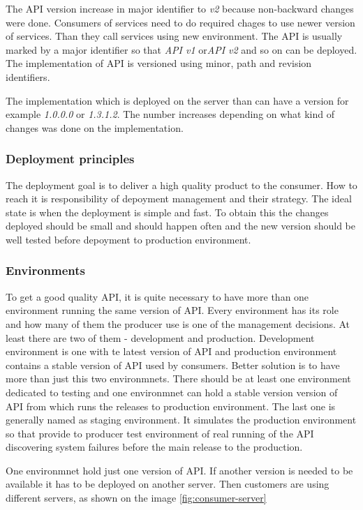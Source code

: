 The API version increase in major identifier to \emph{v2} because non-backward changes were done. Consumers of services need to do required chages to use newer version of services. Than they call services using new environment. 
The API is usually marked by a major identifier so that \emph{API v1} or\emph{API v2} and so on can be deployed.
The implementation of API is versioned using minor, path and revision identifiers. 

The implementation which is deployed on the server than can have a version for example \emph{1.0.0.0} or \emph{1.3.1.2}. The number increases depending on what kind of changes was done on the implementation.

\subsubsection{Deployment principles}
The deployment goal is to deliver a high quality product to the consumer. How to reach it is responsibility of depoyment management and their strategy. The ideal state is when the deployment is simple and fast. To obtain this the changes deployed should be small and should happen often and the new version should be well tested before depoyment to production environment.

\subsubsection{Environments}
To get a good quality API, it is quite necessary to have more than one environment running the same version of API. Every environment has its role and how many of them the producer use is one of the management decisions. At least there are two of them - development and production. Development environment is one with te latest version of API and production environment contains a stable version of API used by consumers.
Better solution is to have more than just this two environmnets. There should be at least one environment dedicated to testing and one environmnet can hold a stable version version of API from which runs the releases to production environment. The last one is generally named as staging environment. It simulates the production environment so that provide to producer test environment of real running of the API discovering system failures before the main release to the production.

One environmnet hold just one version of API. If another version is needed to be available it has to be deployed on another server. Then customers are using different servers, as shown on the image \ref{fig:consumer-server}

